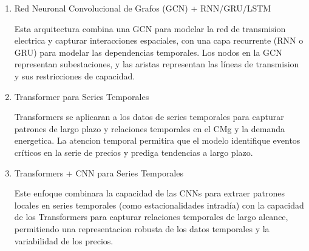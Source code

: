 \documentclass[twocolumn]{article}
\begin{document}
\begin{enumerate}
    \item Red Neuronal Convolucional de Grafos
	(GCN) + RNN/GRU/LSTM

	Esta arquitectura combina una GCN para modelar la red de
	transmision electrica y capturar interacciones espaciales, 
	con una capa recurrente (RNN o GRU) para
	modelar las dependencias temporales. Los nodos
	en la GCN representan subestaciones, y las aristas representan las líneas de
	transmision y sus restricciones de capacidad.

    \item Transformer para Series Temporales
    
	Transformers se aplicaran a los datos de series temporales para 
	capturar patrones de largo plazo y
	relaciones temporales en el CMg y la demanda energetica. 
	La atencion temporal permitira que el
	modelo identifique eventos críticos en la serie de precios y prediga
	 tendencias a largo plazo.

    \item Transformers + CNN para Series Temporales

	Este enfoque combinara la capacidad de las
	CNNs para extraer patrones locales en series temporales 
	(como estacionalidades intradía) con la capacidad de los 
	Transformers para capturar relaciones
	temporales de largo alcance, permitiendo una 
	representacion robusta de los datos temporales y la variabilidad de los precios.
    
\end{enumerate}






\end{document}
